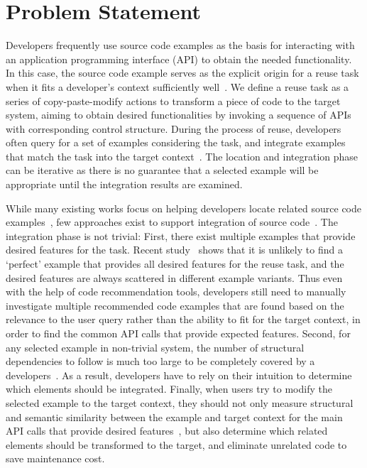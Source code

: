 
\section{Problem Statement}

Developers frequently use source code examples as the basis for interacting with an  application programming interface (API) to obtain the needed functionality.  In this case, the source code example serves as the explicit origin for a reuse task when it fits a developer's context sufficiently well~\cite{Frakes:reuseStatus05, Parsons:cognitiveReuse04}. We define a reuse task as a series of copy-paste-modify actions to transform a piece of code to the target system, aiming to obtain desired functionalities by invoking a sequence of APIs with corresponding control structure.  During the process of reuse, developers often query for a set of examples considering the task, and integrate examples that match the task  into the target context~\cite{Holmes:reuseStudy09}. The location and integration phase can be iterative as there is no guarantee that a selected example will be appropriate until the integration results are examined. 

While many existing works focus on helping developers locate related source code examples~\cite{Holmes:structural05, Xie:ParseWeb07, Xsnippet:OOPSLA06, sniff:Sen09, Denys:portfolio11, Mandelin:jungloid05}, few approaches exist to support integration of source code~\cite{Cottrell:jigsaw08}. The integration phase is not trivial:  First, there exist multiple examples that provide desired features for the task. Recent study~\cite{Holmes:reuseStudy09} shows that it is unlikely to find a `perfect' example that provides all desired features for the reuse task, and the desired features are always scattered in different example variants. Thus even with the help of code recommendation tools, developers still need to manually investigate multiple recommended code examples that are found based on the relevance to the user query rather than the ability to fit for the target context, in order to find the common API calls that provide expected features. Second, for any selected example in non-trivial system, the number of structural dependencies to follow is much too large to be completely covered by a developers~\cite{Holmes:ASE09}.  As a result, developers have to  rely on their intuition to determine which elements should be  integrated. Finally, when users try to modify the selected example to the target context, they should not only  measure structural and semantic similarity between the example and target context for the main API calls that provide desired features~\cite{Cottrell:jigsaw08}, but also determine which related elements should be transformed to the target, and eliminate  unrelated code  to save maintenance cost. %

